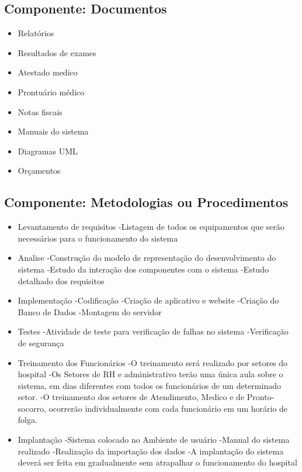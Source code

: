      \subsection{Componente: Documentos }
  \begin{itemize}
  \item Relatórios
  \item Resultados de exames
  \item Atestado medico
  \item Prontuário médico
  \item Notas fiscais
   \item Manuais do sistema
  \item Diagramas UML
  \item Orçamentos
\end{itemize}

     \subsection{Componente: Metodologias ou Procedimentos}
\begin{itemize}
\item Levantamento de requisitos
  \subitem -Listagem de todos os equipamentos que serão necessários para o funcionamento do sistema

 \item Analise
  \subitem -Construção do modelo de representação do desenvolvimento do sistema
   \subitem -Estudo da interação dos componentes com o sistema
    \subitem  -Estudo detalhado dos requisitos

  \item Implementação
  \subitem -Codificação
   \subitem -Criação de aplicativo e website
    \subitem  -Criação do Banco de Dados
     \subitem -Montagem do servidor
   \item Testes
  \subitem -Atividade de teste para verificação de falhas no sistema
   \subitem -Verificação de segurança

    \item Treinamento dos Funcionários
  \subitem -O treinamento será realizado por setores do hospital
   \subitem -Os Setores de RH e administrativo terão uma única aula sobre o sistema, em dias diferentes com todos os funcionários de um determinado setor.
   \subitem -O treinamento dos setores de Atendimento, Medico e de Pronto-socorro, ocorrerão individualmente com cada funcionário em um horário de folga.

   \item Implantação
  \subitem -Sistema colocado no Ambiente de usuário
   \subitem -Manual do sistema realizado
  \subitem -Realização da importação dos dados
   \subitem -A implantação do sistema deverá ser feita em gradualmente sem atrapalhar o funcionamento do hospital
  \end{itemize}
